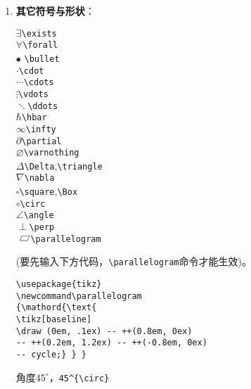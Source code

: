 \documentclass{article}
\newcommand{\q}{\quad}
\newcommand\parallelogram
{\mathord{\text{
\tikz[baseline] 
\draw (0em, .1ex)   -- ++(0.8em, 0ex) 
-- ++(0.2em, 1.2ex) -- ++(-0.8em, 0ex)
-- cycle;} } }
\begin{document}
\begin{multicols}{2}
\begin{enumerate}
\item \textbf{其它符号与形状}：
\vspace{-5mm}
\begin{multicols}{2} 
    $ \exists $\q \verb|\exists| \\
    $ \forall $\q \verb|\forall| \\    
    $ \bullet $ \q \verb|\bullet| \\
    $ \cdot $\q \verb|\cdot| \\
    $ \cdots $\q \verb|\cdots| \\
    $ \vdots $\q \verb|\vdots| \\
    $ \ddots $\q \verb|\ddots| \\
    $ \hbar $\q \verb|\hbar| \\
    $ \infty $\q \verb|\infty| \\
    $ \partial $\q \verb|\partial| \\
    $ \varnothing $\q \verb|\varnothing| \\
    $ \Delta $\q \verb|\Delta|,\verb|\triangle| \\
    $ \nabla $\q \verb|\nabla| \\
    $ \square $\q \verb|\square|,\verb|\Box|  \\
    $ \circ $\q \verb|\circ| \\
    $ \angle $\q \verb|\angle| \\
    $ \perp $\q \verb|\perp| \\   
    $ \parallelogram $\q \verb|\parallelogram|
\end{multicols} 
\vspace{-5mm} 
(要先输入下方代码，\verb|\parallelogram|命令才能生效)。
\begin{lstlisting}
\usepackage{tikz}
\newcommand\parallelogram
{\mathord{\text{
\tikz[baseline] 
\draw (0em, .1ex) -- ++(0.8em, 0ex) 
-- ++(0.2em, 1.2ex) -- ++(-0.8em, 0ex)
-- cycle;} } }
\end{lstlisting} 
角度$ 45^{\circ} $，\verb|45^{\circ}|


\end{enumerate}
\end{multicols}
\end{document}
